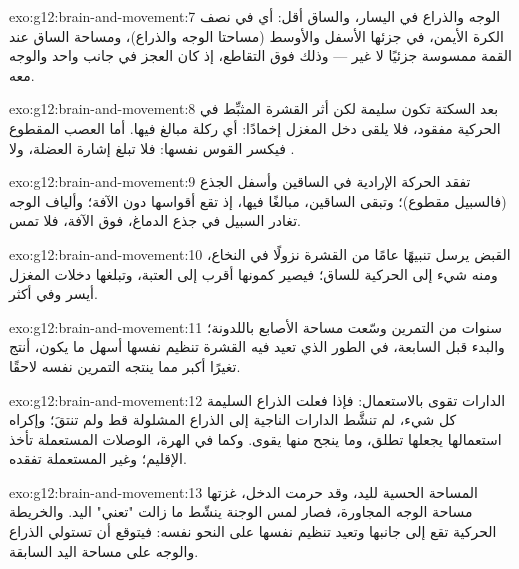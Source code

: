 \begin{solution}{exo:g12:brain-and-movement:7}
الوجه والذراع في اليسار، والساق أقل: أي  في نصف الكرة
الأيمن، في جزئها الأسفل والأوسط (مساحتا الوجه والذراع)، ومساحة الساق
عند القمة ممسوسة جزئيًا لا غير --- وذلك فوق التقاطع، إذ كان العجز في
جانب واحد والوجه معه.
\end{solution}

\begin{solution}{exo:g12:brain-and-movement:8}
بعد السكتة تكون  سليمة لكن أثر القشرة المثبِّط في
 الحركية مفقود، فلا يلقى دخل المغزل إخمادًا: أي ركلة مبالغ
فيها. أما العصب المقطوع فيكسر القوس نفسها: فلا تبلغ إشارة العضلة، ولا
.
\end{solution}

\begin{solution}{exo:g12:brain-and-movement:9}
تفقد الحركة الإرادية في الساقين وأسفل الجذع (فالسبيل مقطوع)؛ وتبقى
 الساقين، مبالغًا فيها، إذ تقع أقواسها دون الآفة؛ وألياف الوجه
تغادر السبيل في جذع الدماغ، فوق الآفة، فلا تمس.
\end{solution}

\begin{solution}{exo:g12:brain-and-movement:10}
القبض يرسل تنبيهًا عامًا من القشرة نزولًا في النخاع، ومنه شيء إلى
 الحركية للساق؛ فيصير كمونها أقرب إلى العتبة، وتبلغها دخلات
المغزل أيسر وفي  أكثر.
\end{solution}

\begin{solution}{exo:g12:brain-and-movement:11}
سنوات من التمرين وسّعت مساحة الأصابع باللدونة؛ والبدء قبل السابعة، في
الطور الذي تعيد فيه القشرة تنظيم نفسها أسهل ما يكون، أنتج تغيرًا أكبر
مما ينتجه التمرين نفسه لاحقًا.
\end{solution}

\begin{solution}{exo:g12:brain-and-movement:12}
الدارات تقوى بالاستعمال: فإذا فعلت الذراع السليمة كل شيء، لم تنشَّط
الدارات الناجية إلى الذراع المشلولة قط ولم تنتقَ؛ وإكراه استعمالها
يجعلها تطلق، وما ينجح منها يقوى. وكما في الهرة، الوصلات المستعملة تأخذ
الإقليم؛ وغير المستعملة تفقده.
\end{solution}

\begin{solution}{exo:g12:brain-and-movement:13}
المساحة الحسية لليد، وقد حرمت الدخل، غزتها مساحة الوجه المجاورة، فصار
لمس الوجنة ينشّط  ما زالت "تعني" اليد. والخريطة الحركية تقع إلى
جانبها وتعيد تنظيم نفسها على النحو نفسه: فيتوقع أن تستولي الذراع
والوجه على مساحة اليد السابقة.
\end{solution}


